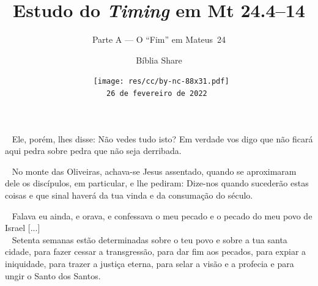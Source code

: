 \documentclass[12pt,aspectratio=169]{beamer}
\title{Estudo do \textit{Timing} em Mt 24.4--14}
\subtitle{Parte A --- O ``Fim'' em Mateus~24}
\author{Bíblia Share}
\date[{\tiny\tt{26 de fevereiro de 2022}}]{{\scriptsize\tt%
    \texttt{[image: res/cc/by-nc-88x31.pdf]}\\[\smallskipamount]
    26 de fevereiro de 2022%
}}
\newcommand{\ver}[1]{%
    \raisebox{0.50ex}{%
        \scalebox{1.1}{%
            \pmb{\textbf{\textcolor{BSpbg}{#1}}}%
        }%
    }%
}
\newcommand{\QUOTE}[1]{%
    \par\noindent\hspace*{0.1\linewidth}%
    \begin{minipage}{0.8\linewidth}%
        \linespread{1.35}\large{#1}%
    \end{minipage}%
}
\newcommand{\ORA}[1]{{\textcolor{TXora}{#1}}}
\newcommand{\YEL}[1]{{\textcolor{TXyel}{#1}}}
\newcommand{\GRE}[1]{{\textcolor{TXgre}{#1}}}
\newcommand{\MAG}[1]{{\textcolor{TXmag}{#1}}}
\newcommand{\BRI}[1]{{\textcolor{BSpbg}{#1}}}   %
\begin{document}
\begin{frame}
    \titlepage
\end{frame}

    \begin{frame}
        \QUOTE{%
            \ver{(ARA) Mt~24.2}~%
            Ele, porém, lhes disse: \YEL{Não vedes tudo  isto?}  Em  verdade  vos  digo  que
            \YEL{não ficará aqui pedra sobre pedra que não seja derribada.}
        }
    \end{frame}

    \begin{frame}
        \QUOTE{%
            \ver{(ARA) Mt~24.3}~%
            No monte das Oliveiras, achava-se Jesus assentado, quando se aproximaram dele os
            discípulos, \BRI{em particular}, e lhe pediram: Dize-nos  \YEL{quando  sucederão
            estas coisas} e \GRE{que sinal haverá da tua  vinda}  e  da  \MAG{consumação  do
            século}.
        }
    \end{frame}

    \begin{frame}
        \QUOTE{%
            \ver{(ARA) Dn~9.20a}~%
            Falava eu ainda, e orava, e confessava o meu pecado e o pecado do \YEL{meu  povo
            de Israel} [...] \\[\bigskipamount]
            \ver{(ARA) Dn~9.24}~%
            \GRE{Setenta semanas} estão \MAG{determinadas} sobre \YEL{o teu  povo}  e  sobre
            \ORA{a tua santa cidade}, para fazer cessar a transgressão,  para  dar  fim  aos
            pecados, para \BRI{expiar a iniquidade}, para  \BRI{trazer  a  justiça  eterna},
            para selar a visão e a profecia e para ungir o Santo dos Santos.
        }
    \end{frame}
\end{document}
